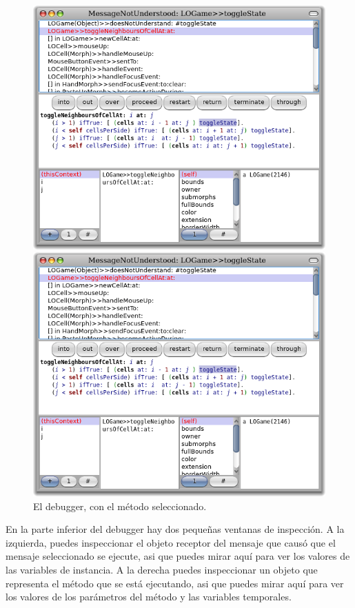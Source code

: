 \documentclass[a4paper,10pt,twoside]{book}
\begin{document}
\begin{figure}[ht]
\ifluluelse
	{\centerline {\includegraphics[width=\textwidth]{Debugger}}}
	{\centerline {\includegraphics[scale=0.7]{Debugger}}}
\caption{El debugger, con el m\'etodo   seleccionado.
}
\end{figure}

En la parte inferior del debugger hay dos peque\~nas ventanas de inspecci\'on. A la izquierda, puedes inspeccionar el objeto receptor del mensaje que caus\'o que el mensaje seleccionado se ejecute, asi que puedes mirar aqu\'i para ver los valores de las variables de instancia.
A la derecha puedes inspeccionar un objeto que representa el m\'etodo que se est\'a ejecutando, asi que puedes mirar aqu\'i para ver los valores de los par\'ametros del m\'etodo y las variables temporales.
\end{document}
